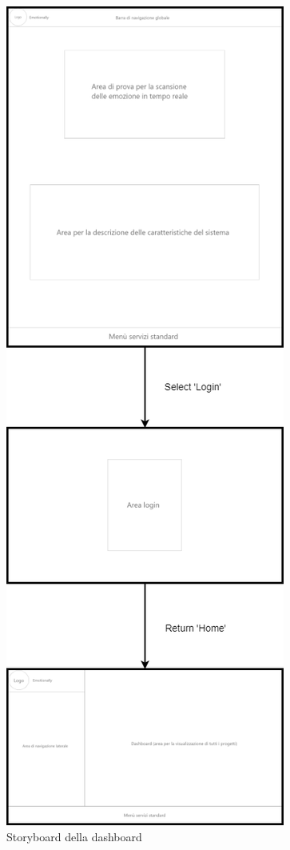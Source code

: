 \begin{figure}[H]
	\centering

	\caption{Storyboard della dashboard}
	\label{fig:storyboard:dashboard}
	\includegraphics[height=\textheight-3ex]{images/storyboard/dashboard}
\end{figure}

